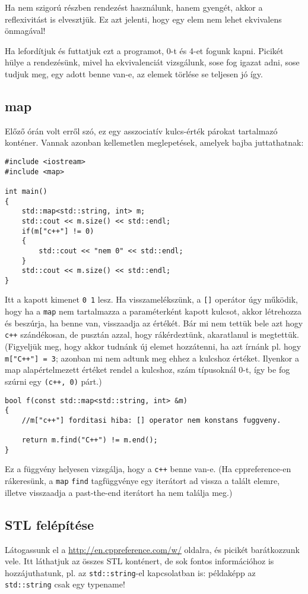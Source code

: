\documentclass[a4paper,11.5pt]{article}
\begin{document}
	Ha nem szigorú részben rendezést használunk, hanem gyengét, akkor a reflexivitást is elvesztjük. Ez azt jelenti, hogy egy elem nem lehet ekvivalens önmagával!
	
	Ha lefordítjuk és futtatjuk ezt a programot, 0-t és 4-et fogunk kapni. Picikét hülye a rendezésünk, mivel ha ekvivalenciát vizsgálunk, sose fog igazat adni, sose tudjuk meg, egy adott benne van-e, az elemek törlése se teljesen jó így.
	\subsection{map}
	Előző órán volt erről szó, ez egy asszociatív kulcs-érték párokat tartalmazó konténer. Vannak azonban kellemetlen meglepetések, amelyek bajba juttathatnak:
\begin{lstlisting}
#include <iostream>
#include <map>

int main()
{
	std::map<std::string, int> m;
	std::cout << m.size() << std::endl;
	if(m["c++"] != 0)
	{
		std::cout << "nem 0" << std::endl;
	}
	std::cout << m.size() << std::endl;
}
\end{lstlisting}
	Itt a kapott kimenet \texttt{0 1} lesz. Ha visszamelékszünk, a \texttt{[]} operátor úgy működik, hogy ha a \texttt{map} nem tartalmazza a paraméterként kapott kulcsot, akkor létrehozza és beszúrja, ha benne van, visszaadja az értékét. Bár mi nem tettük bele azt hogy \texttt{c++} szándékosan, de pusztán azzal, hogy rákérdeztünk, akaratlanul is megtettük. (Figyeljük meg, hogy akkor tudnánk új elemet hozzátenni, ha azt írnánk pl. hogy \texttt{m["C++"] = 3}; azonban mi nem adtunk meg ehhez a kulcshoz értéket. Ilyenkor a map alapértelmezett értéket rendel a kulcshoz, szám típusoknál 0-t, így be fog szúrni egy \texttt{(c++, 0)} párt.)
	\begin{lstlisting}
bool f(const std::map<std::string, int> &m)
{
	//m["c++"] forditasi hiba: [] operator nem konstans fuggveny.
	
	return m.find("C++") != m.end();
}
	\end{lstlisting}
	Ez a függvény helyesen vizsgálja, hogy a \texttt{c++} benne van-e. (Ha cppreference-en rákeresünk, a \texttt{map} \texttt{find} tagfüggvénye egy iterátort ad vissza a talált elemre, illetve visszaadja a past-the-end iterátort ha nem találja meg.)
	\subsection{STL felépítése}
	Látogassunk el a \url{http://en.cppreference.com/w/} oldalra, és picikét barátkozzunk vele. Itt láthatjuk az összes STL konténert, de sok fontos információhoz is hozzájuthatunk, pl. az \texttt{std::string}-el kapcsolatban is: példaképp az \texttt{std::string} csak egy typename!
	
\end{document}
